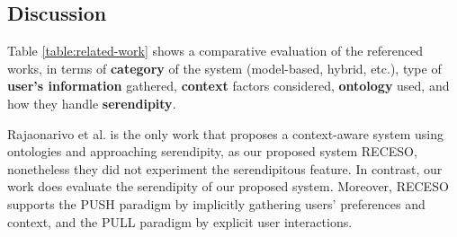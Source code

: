 

\vspace{-0.2cm}
\subsection{Discussion}

Table \ref{table:related-work} shows a comparative evaluation  of the referenced works, in terms of \textbf{category} of the system (model-based, hybrid, etc.), type of \textbf{user's information} gathered, \textbf{context} factors considered, \textbf{ontology} used, and how they handle \textbf{serendipity}. 

Rajaonarivo et al. \cite{rajaonarivo2019rec} is the only work that proposes a context-aware system using ontologies and approaching serendipity, as our proposed system RECESO, nonetheless they did not experiment the serendipitous feature. In contrast, our work does evaluate the serendipity of our proposed system. Moreover, RECESO supports the PUSH paradigm by implicitly gathering users' preferences and context, and the PULL paradigm by explicit user interactions.


